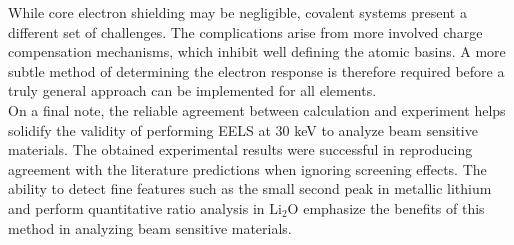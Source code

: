 While core electron shielding may be negligible, covalent systems present a different set of challenges. The complications arise from more involved charge compensation mechanisms, which inhibit well defining the atomic basins.  A more subtle method of determining the electron response is therefore required before a truly general approach can be implemented for all elements.  \\

On a  final note, the reliable agreement between calculation and experiment helps solidify the validity of performing EELS at 30 keV to analyze beam sensitive materials.  The obtained experimental results were successful in reproducing agreement with the literature predictions when ignoring screening effects.  The ability to detect fine features such as the small second peak in metallic lithium and perform quantitative ratio analysis in $ \mathrm{Li_2O} $ emphasize the benefits of this method in analyzing beam sensitive materials.  \\









